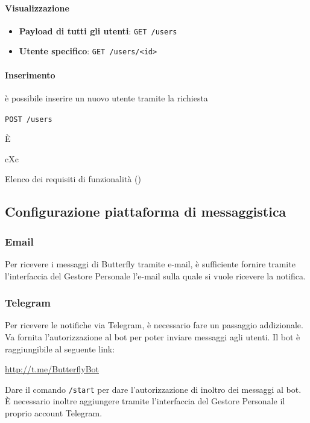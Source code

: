 \paragraph{Visualizzazione}

\begin{itemize}
    \item \textbf{Payload di tutti gli utenti}: \texttt{GET /users}
    \item \textbf{Utente specifico}: \texttt{GET /users/<id>}
\end{itemize}

\paragraph{Inserimento}
    è possibile inserire un nuovo utente tramite la richiesta
    \begin{center}
        \texttt{POST /users}
    \end{center}

È
\begin{table}[H]
    \begin{paddedtablex}[1.7]{\textwidth}{cXc}%

        \bottomrule
    \end{paddedtablex}
    \caption{Elenco dei requisiti di funzionalità (\thetableCounter)}
\end{table}

\subsection{Configurazione piattaforma di messaggistica}

\subsubsection{Email}

Per ricevere i messaggi di Butterfly tramite e-mail, è sufficiente fornire tramite l'interfaccia del Gestore Personale l'e-mail sulla
quale si vuole ricevere la notifica.

\subsubsection{Telegram}

Per ricevere le notifiche via Telegram, è necessario fare un passaggio addizionale. Va fornita l'autorizzazione al bot per poter inviare messaggi
agli utenti. Il bot è raggiungibile al seguente link:
\begin{center}
    \url{http://t.me/ButterflyBot}
\end{center}

Dare il comando \texttt{/start} per dare l'autorizzazione di inoltro dei messaggi al bot.
È necessario inoltre aggiungere tramite l'interfaccia del Gestore Personale il proprio account Telegram.
